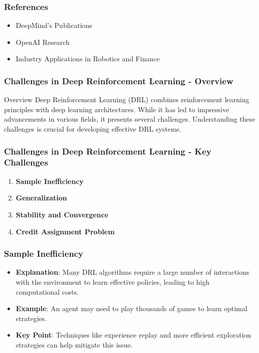 \documentclass[aspectratio=169]{beamer}
\begin{document}
\begin{frame}[fragile]
    \frametitle{References}
    \begin{itemize}
        \item DeepMind's Publications
        \item OpenAI Research
        \item Industry Applications in Robotics and Finance
    \end{itemize}
\end{frame}

\begin{frame}[fragile]
    \frametitle{Challenges in Deep Reinforcement Learning - Overview}
    \begin{block}{Overview}
        Deep Reinforcement Learning (DRL) combines reinforcement learning principles with deep learning architectures. While it has led to impressive advancements in various fields, it presents several challenges. Understanding these challenges is crucial for developing effective DRL systems.
    \end{block}
\end{frame}

\begin{frame}[fragile]
    \frametitle{Challenges in Deep Reinforcement Learning - Key Challenges}
    \begin{enumerate}
        \item \textbf{Sample Inefficiency}
        \item \textbf{Generalization}
        \item \textbf{Stability and Convergence}
        \item \textbf{Credit Assignment Problem}
    \end{enumerate}
\end{frame}

\begin{frame}[fragile]
    \frametitle{Sample Inefficiency}
    \begin{itemize}
        \item \textbf{Explanation}: Many DRL algorithms require a large number of interactions with the environment to learn effective policies, leading to high computational costs.
        \item \textbf{Example}: An agent may need to play thousands of games to learn optimal strategies.
        \item \textbf{Key Point}: Techniques like experience replay and more efficient exploration strategies can help mitigate this issue.
    \end{itemize}
\end{frame}
\end{document}
